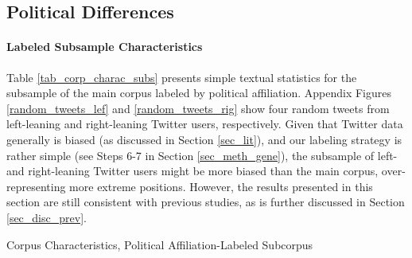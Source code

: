 \subsection{Political Differences}\label{sec_res_exp}

    \paragraph{Labeled Subsample Characteristics}

    Table \ref{tab_corp_charac_subs} presents simple textual statistics for the subsample of the main corpus labeled by political affiliation. Appendix Figures \ref{random_tweets_lef} and \ref{random_tweets_rig} show four random tweets from left-leaning and right-leaning Twitter users, respectively. Given that Twitter data generally is biased (as discussed in Section \ref{sec_lit}), and our labeling strategy is rather simple (see Steps 6-7 in Section \ref{sec_meth_gene}), the subsample of left- and right-leaning Twitter users might be more biased than the main corpus, over-representing more extreme positions. However, the results presented in this section are still consistent with previous studies, as is further discussed in Section \ref{sec_disc_prev}.

    \begin{table}[H]
            \centering
            
            
            
            \caption{Corpus Characteristics, Political Affiliation-Labeled Subcorpus}
            
            \label{tab_corp_charac_subs}
        \end{table}
        
